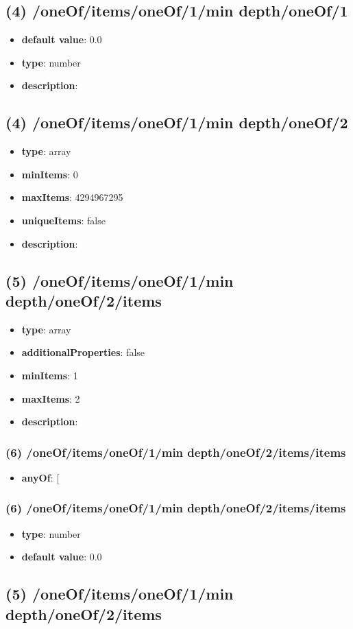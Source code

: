 \subsection{(4) /oneOf/items/oneOf/1/min depth/oneOf/1}
\begin{itemize}[leftmargin=4em]\item {\bf default value}: 0.0
\item {\bf type}: number
\item {\bf description}: 
\end{itemize}\subsection{(4) /oneOf/items/oneOf/1/min depth/oneOf/2}
\begin{itemize}[leftmargin=4em]\item {\bf type}: array
\item {\bf minItems}: 0
\item {\bf maxItems}: 4294967295
\item {\bf uniqueItems}: false
\item {\bf description}: 
\end{itemize}\subsection{(5) /oneOf/items/oneOf/1/min depth/oneOf/2/items}
\begin{itemize}[leftmargin=5em]\item {\bf type}: array
\item {\bf additionalProperties}: false
\item {\bf minItems}: 1
\item {\bf maxItems}: 2
\item {\bf description}: 
\end{itemize}\subsubsection{(6) /oneOf/items/oneOf/1/min depth/oneOf/2/items/items}
\begin{itemize}[leftmargin=6em]\item {\bf anyOf}: [\end{itemize}\subsubsection{(6) /oneOf/items/oneOf/1/min depth/oneOf/2/items/items}
\begin{itemize}[leftmargin=6em]\item {\bf type}: number\item {\bf default value}: 0.0
\end{itemize}\subsection{(5) /oneOf/items/oneOf/1/min depth/oneOf/2/items}
